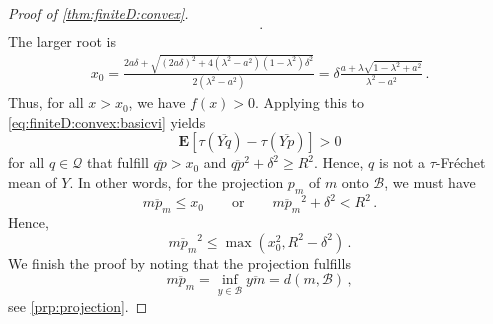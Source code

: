 \documentclass{article}
\newcommand*{\mc}[1]{\mathcal{#1}}
\newcommand{\lab}{\left[} %
\newcommand{\rab}{\right]} %
\newcommand{\ab}[1]{\lab #1 \rab} %
\newcommand{\abOf}[1]{\!\ab{#1}} %
\newcommand{\lb}{\left(} %
\newcommand{\rb}{\right)} %
\newcommand{\br}[1]{\lb #1 \rb} %
\newcommand{\brOf}[1]{\!\br{#1}} %
\newcommand{\E}{\mathbf{E}} %
\newcommand{\EOf}[1]{\E\abOf{#1}}
\newcommand{\eqcm}{\,,} %
\newcommand{\eqfs}{\,.}
\newcommand{\ol}[2]{\overline{#1#2}}
\newcommand{\tran}{\tau}
\begin{document}
\begin{proof}[Proof of \cref{thm:finiteD:convex}]
\begin{align}
        \eqfs
    \end{align}
    The larger root is
    \begin{align}
        x_0 = \frac{2 a \delta + \sqrt{(2 a \delta)^2 + 4 (\lambda^2 - a^2) (1-\lambda^2) \delta^2}}{2 (\lambda^2 - a^2)}
        =
        \delta \frac{a + \lambda \sqrt{1 -\lambda^2 + a^2}}{\lambda^2 - a^2}
        \eqfs
    \end{align}
    Thus, for all $x  > x_0$, we have $f(x) > 0$.
    Applying this to \eqref{eq:finiteD:convex:basicvi} yields
    \begin{equation}
        \EOf{\tran(\ol Yq) - \tran(\ol Yp)} > 0 
    \end{equation}
    for all $q\in\mc Q$ that fulfill $\ol qp > x_0$ and $\ol qp^2 + \delta^2 \geq R^2$.
    Hence, $q$ is not a $\tran$-Fr\'echet mean of $Y$. In other words, for the projection $p_m$ of $m$ onto $\mc B$, we must have
    \begin{equation}
        \ol m{p_m} \leq x_0 \qquad\text{or}\qquad \ol m{p_m}^2 + \delta^2 < R^2
        \eqfs
    \end{equation}
    Hence,
    \begin{equation}
        \ol m{p_m}^2 \leq \max\brOf{x_0^2, R^2 - \delta^2}
        \eqfs
    \end{equation}
    We finish the proof by noting that the projection fulfills
    \begin{equation}
        \ol m{p_m} = \inf_{y \in \mc B} \ol ym = d(m, \mc B)
        \eqcm
    \end{equation}
    see \cref{prp:projection}.
\end{proof}
%
\end{document}
